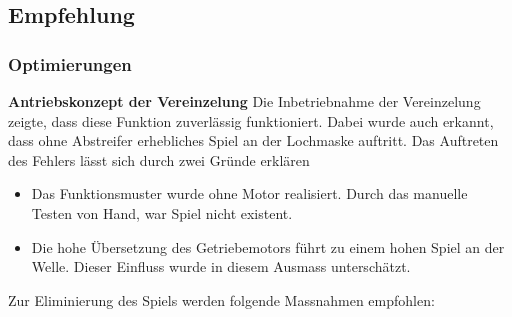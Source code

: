 \subsection{Empfehlung}

\subsubsection{Optimierungen}

\textbf{Antriebskonzept der Vereinzelung}
\newline
Die Inbetriebnahme der Vereinzelung zeigte, dass diese Funktion zuverlässig funktioniert. Dabei wurde auch erkannt, dass ohne Abstreifer erhebliches Spiel an der Lochmaske auftritt. Das Auftreten des Fehlers lässt sich durch zwei Gründe erklären
\begin{itemize}
	\item Das Funktionsmuster wurde ohne Motor realisiert. Durch das manuelle Testen von Hand, war Spiel nicht existent.
	
	\item Die hohe Übersetzung des Getriebemotors führt zu einem hohen Spiel an der Welle. Dieser Einfluss wurde in diesem Ausmass unterschätzt.
\end{itemize}

Zur Eliminierung des Spiels werden folgende Massnahmen empfohlen:

